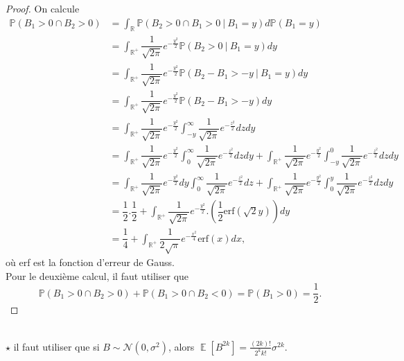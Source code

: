 \documentclass{article}
\theoremstyle{definition}
\numberwithin{equation}{section}
\DeclareMathOperator{\R}{\mathbb{R}}
\DeclareMathOperator{\E}{\mathbb{E}}
\begin{document}
\begin{proof}
On calcule
\begin{align*}
    \mathbb{P}(B_1>0 \cap B_2>0) &= \int_{\R} \mathbb{P}(B_2>0\cap B_1>0~|~B_1=
    y)d\mathbb{P}(B_1=y)\\
    &=\int_{\R^+}\dfrac{1}{\sqrt{2\pi}}e^{-\frac{y^2}{2}}\mathbb{P}(B_2>0~|~B_1=y)dy\\
    &=\int_{\R^+}\dfrac{1}{\sqrt{2\pi}}e^{-\frac{y^2}{2}}\mathbb{P}(B_2-B_1>-y~|~B_1=y)dy\\
    &=\int_{\R^+}\dfrac{1}{\sqrt{2\pi}}e^{-\frac{y^2}{2}}\mathbb{P}(B_2-B_1>-y)dy\\
    &=\int_{\R^+}\dfrac{1}{\sqrt{2\pi}}e^{-\frac{y^2}{2}}\int_{-y}^\infty \dfrac{1}{\sqrt{2\pi}}e^{-\frac{z^2}{2}}dzdy\\
    &=\int_{\R^+}\dfrac{1}{\sqrt{2\pi}}e^{-\frac{y^2}{2}}\int_0^\infty \dfrac{1}{\sqrt{2\pi}}e^{-\frac{z^2}{2}}dzdy + \int_{\R^+}\dfrac{1}{\sqrt{2\pi}}e^{-\frac{y^2}{2}}\int_{-y}^0 \dfrac{1}{\sqrt{2\pi}}e^{-\frac{z^2}{2}}dzdy\\
    &=\int_{\R^+}\dfrac{1}{\sqrt{2\pi}}e^{-\frac{y^2}{2}}dy\int_0^\infty \dfrac{1}{\sqrt{2\pi}}e^{-\frac{z^2}{2}}dz + \int_{\R^+}\dfrac{1}{\sqrt{2\pi}}e^{-\frac{y^2}{2}}\int_0^y \dfrac{1}{\sqrt{2\pi}}e^{-\frac{z^2}{2}}dzdy\\
    &=\dfrac{1}{2}.\dfrac{1}{2}+\int_{\R^+}\dfrac{1}{\sqrt{2\pi}}e^{-\frac{y^2}{2}}.\left(\dfrac{1}{2}\text{erf}(\sqrt{2}y)\right)dy\\
    &=\dfrac{1}{4}+\int_{\R^+}\dfrac{1}{2\sqrt{\pi}}e^{-\frac{x^2}{4}}\text{erf}(x)dx,
\end{align*}
où erf est la fonction d'erreur de Gauss.\\
Pour le deuxième calcul, il faut utiliser que 
$$ \mathbb{P}(B_1>0\cap B_2>0)+\mathbb{P}(B_1>0\cap B_2<0)= \mathbb{P}(B_1>0)=\dfrac{1}{2}. $$
\end{proof}

~\\
$\star$ il faut utiliser que si $B\sim \mathcal{N}(0,\sigma^2)$, alors $\E[B^{2k}]=\frac{(2k)!}{2^kk!}\sigma^{2k}$.
\end{document}
